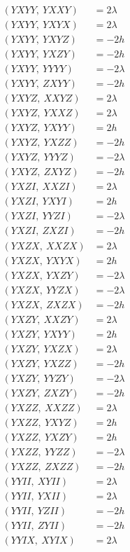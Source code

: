 \documentclass{article}
\begin{document}
\begin{align*}
  (YXYY,\ YXXY) &= 2 \lambda \\
  (YXYY,\ YXYX) &= 2 \lambda \\
  (YXYY,\ YXYZ) &= - 2 h \\
  (YXYY,\ YXZY) &= - 2 h \\
  (YXYY,\ YYYY) &= - 2 \lambda \\
  (YXYY,\ ZXYY) &= - 2 h \\
  (YXYZ,\ XXYZ) &= 2 \lambda \\
  (YXYZ,\ YXXZ) &= 2 \lambda \\
  (YXYZ,\ YXYY) &= 2 h \\
  (YXYZ,\ YXZZ) &= - 2 h \\
  (YXYZ,\ YYYZ) &= - 2 \lambda \\
  (YXYZ,\ ZXYZ) &= - 2 h \\
  (YXZI,\ XXZI) &= 2 \lambda \\
  (YXZI,\ YXYI) &= 2 h \\
  (YXZI,\ YYZI) &= - 2 \lambda \\
  (YXZI,\ ZXZI) &= - 2 h \\
  (YXZX,\ XXZX) &= 2 \lambda \\
  (YXZX,\ YXYX) &= 2 h \\
  (YXZX,\ YXZY) &= - 2 \lambda \\
  (YXZX,\ YYZX) &= - 2 \lambda \\
  (YXZX,\ ZXZX) &= - 2 h \\
  (YXZY,\ XXZY) &= 2 \lambda \\
  (YXZY,\ YXYY) &= 2 h \\
  (YXZY,\ YXZX) &= 2 \lambda \\
  (YXZY,\ YXZZ) &= - 2 h \\
  (YXZY,\ YYZY) &= - 2 \lambda \\
  (YXZY,\ ZXZY) &= - 2 h \\
  (YXZZ,\ XXZZ) &= 2 \lambda \\
  (YXZZ,\ YXYZ) &= 2 h \\
  (YXZZ,\ YXZY) &= 2 h \\
  (YXZZ,\ YYZZ) &= - 2 \lambda \\
  (YXZZ,\ ZXZZ) &= - 2 h \\
  (YYII,\ XYII) &= 2 \lambda \\
  (YYII,\ YXII) &= 2 \lambda \\
  (YYII,\ YZII) &= - 2 h \\
  (YYII,\ ZYII) &= - 2 h \\
  (YYIX,\ XYIX) &= 2 \lambda \\

\end{align*}
\end{document}
